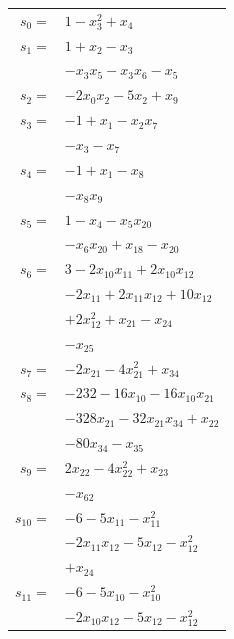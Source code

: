 \begingroup
\small
\setlength{\tabcolsep}{2pt}
\setlength{\LTleft}{0pt}
\begin{longtable}{@{}r@{\;}l@{}}
\(s_{0}=\) & \(\displaystyle 1 -x_{3}^{2} +x_{4}\) \\[3pt]
\(s_{1}=\) & \(\displaystyle 1 +x_{2} -x_{3}\) \\
 & \(\displaystyle -x_{3}x_{5} -x_{3}x_{6} -x_{5}\) \\[3pt]
\(s_{2}=\) & \(\displaystyle -2x_{0}x_{2} -5x_{2} +x_{9}\) \\[3pt]
\(s_{3}=\) & \(\displaystyle -1 +x_{1} -x_{2}x_{7}\) \\
 & \(\displaystyle -x_{3} -x_{7}\) \\[3pt]
\(s_{4}=\) & \(\displaystyle -1 +x_{1} -x_{8}\) \\
 & \(\displaystyle -x_{8}x_{9}\) \\[3pt]
\(s_{5}=\) & \(\displaystyle 1 -x_{4} -x_{5}x_{20}\) \\
 & \(\displaystyle -x_{6}x_{20} +x_{18} -x_{20}\) \\[3pt]
\(s_{6}=\) & \(\displaystyle 3 -2x_{10}x_{11} +2x_{10}x_{12}\) \\
 & \(\displaystyle -2x_{11} +2x_{11}x_{12} +10x_{12}\) \\
 & \(\displaystyle +2x_{12}^{2} +x_{21} -x_{24}\) \\
 & \(\displaystyle -x_{25}\) \\[3pt]
\(s_{7}=\) & \(\displaystyle -2x_{21} -4x_{21}^{2} +x_{34}\) \\[3pt]
\(s_{8}=\) & \(\displaystyle -232 -16x_{10} -16x_{10}x_{21}\) \\
 & \(\displaystyle -328x_{21} -32x_{21}x_{34} +x_{22}\) \\
 & \(\displaystyle -80x_{34} -x_{35}\) \\[3pt]
\(s_{9}=\) & \(\displaystyle 2x_{22} -4x_{22}^{2} +x_{23}\) \\
 & \(\displaystyle -x_{62}\) \\[3pt]
\(s_{10}=\) & \(\displaystyle -6 -5x_{11} -x_{11}^{2}\) \\
 & \(\displaystyle -2x_{11}x_{12} -5x_{12} -x_{12}^{2}\) \\
 & \(\displaystyle +x_{24}\) \\[3pt]
\(s_{11}=\) & \(\displaystyle -6 -5x_{10} -x_{10}^{2}\) \\
 & \(\displaystyle -2x_{10}x_{12} -5x_{12} -x_{12}^{2}\) \\

\end{longtable}
